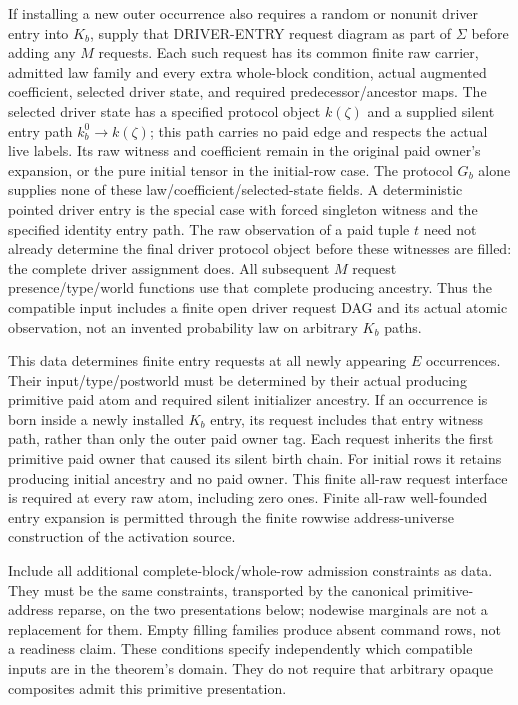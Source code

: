 \documentclass[11pt]{article}\usepackage{amsmath,amssymb,amsthm,geometry}\geometry{margin=1in}
\begin{document}
If installing a new outer occurrence also requires a random or nonunit driver entry into $K_b$, supply that DRIVER-ENTRY request diagram as part of $\Sigma$ before adding any $M$ requests. Each such request has its common finite raw carrier, admitted law family and every extra whole-block condition, actual augmented coefficient, selected driver state, and required predecessor/ancestor maps. The selected driver state has a specified protocol object $k(\zeta)$ and a supplied silent entry path $k_b^0\to k(\zeta)$; this path carries no paid edge and respects the actual live labels. Its raw witness and coefficient remain in the original paid owner's expansion, or the pure initial tensor in the initial-row case. The protocol $G_b$ alone supplies none of these law/coefficient/selected-state fields. A deterministic pointed driver entry is the special case with forced singleton witness and the specified identity entry path. The raw observation of a paid tuple $t$ need not already determine the final driver protocol object before these witnesses are filled: the complete driver assignment does. All subsequent $M$ request presence/type/world functions use that complete producing ancestry. Thus the compatible input includes a finite open driver request DAG and its actual atomic observation, not an invented probability law on arbitrary $K_b$ paths.

This data determines finite entry requests at all newly appearing $E$ occurrences. Their input/type/postworld must be determined by their actual producing primitive paid atom and required silent initializer ancestry. If an occurrence is born inside a newly installed $K_b$ entry, its request includes that entry witness path, rather than only the outer paid owner tag. Each request inherits the first primitive paid owner that caused its silent birth chain. For initial rows it retains producing initial ancestry and no paid owner. This finite all-raw request interface is required at every raw atom, including zero ones. Finite all-raw well-founded entry expansion is permitted through the finite rowwise address-universe construction of the activation source.

Include all additional complete-block/whole-row admission constraints as data. They must be the same constraints, transported by the canonical primitive-address reparse, on the two presentations below; nodewise marginals are not a replacement for them. Empty filling families produce absent command rows, not a readiness claim. These conditions specify independently which compatible inputs are in the theorem's domain. They do not require that arbitrary opaque composites admit this primitive presentation.
\end{document}
